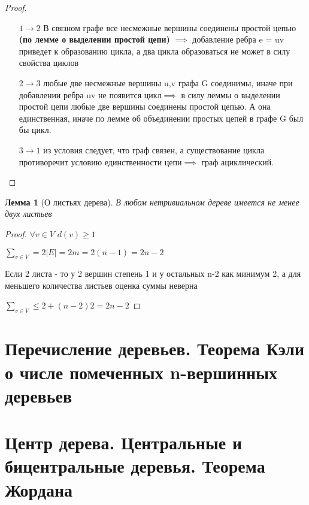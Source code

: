 \documentclass[a4paper]{article}
\newtheorem{lemma}{Лемма}[section]
\theoremstyle{definition}
\theoremstyle{remark}
\begin{document}
\begin{multicols*}{2}
    \begin{proof}
        \begin{itemize}
            \item[$1\to 2$] В связном графе все несмежные вершины соединены простой цепью \textbf{(по лемме о выделении простой цепи)}
            $\implies$ добавление ребра e = uv приведет к образованию цикла, а два цикла образоваться не может в силу свойства циклов
            \item[$2 \to 3$] любые две несмежные вершины u,v графа G соединимы, иначе при добавлении ребра uv не появится цикл$\implies$
            в силу леммы о выделении простой цепи любые две вершины соединены простой цепью. А она единственная, иначе по лемме об 
            объединении простых цепей в графе G был бы цикл.
            \item[$3\to1$]из условия следует, что граф связен, а существование цикла противоречит условию единственности цепи$\implies$
            граф ациклический.
        \end{itemize}
    \end{proof}
    \begin{lemma}[О листьях дерева]
        В любом нетривиальном дереве имеется не менее двух листьев
    \end{lemma}
    \begin{proof}
        $\forall v\in V$ $d(v)\geq 1$

        $\sum_{v\in V} = 2|E|=2m=2(n-1)=2n-2$

        Если 2 листа - то у 2 вершин степень 1 и у остальных n-2 как минимум 2,
        а для меньшего количества листьев оценка суммы неверна

        $\sum_{v\in V} \leq 2 + (n-2)2 = 2n - 2$
    \end{proof}
    \section{Перечисление деревьев. Теорема Кэли о числе помеченных n-вершинных деревьев}
    \section{Центр дерева. Центральные и бицентральные деревья. Теорема Жордана}

\end{multicols*}
\end{document}
